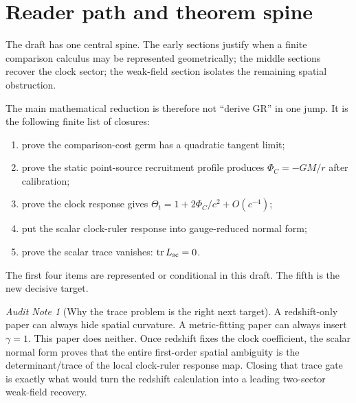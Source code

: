 \documentclass[11pt]{article}
\theoremstyle{remark}
\newtheorem{audit}[theorem]{Audit Note}
\begin{document}
\section{Reader path and theorem spine}
\label{sec:reader-path}

The draft has one central spine.  The early sections justify when a finite comparison calculus may be represented geometrically; the middle sections recover the clock sector; the weak-field section isolates the remaining spatial obstruction.

\begin{center}
\end{center}

The main mathematical reduction is therefore not ``derive GR'' in one jump.  It is the following finite list of closures:
\begin{enumerate}
\item prove the comparison-cost germ has a quadratic tangent limit;
\item prove the static point-source recruitment profile produces \(\Phi_C=-GM/r\) after calibration;
\item prove the clock response gives \(\Theta_t=1+2\Phi_C/c^2+O(c^{-4})\);
\item put the scalar clock-ruler response into gauge-reduced normal form;
\item prove the scalar trace vanishes: \(\operatorname{tr}L_{\rm sc}=0\).
\end{enumerate}
The first four items are represented or conditional in this draft.  The fifth is the new decisive target.

\begin{audit}[Why the trace problem is the right next target]
A redshift-only paper can always hide spatial curvature.  A metric-fitting paper can always insert \(\gamma=1\).  This paper does neither.  Once redshift fixes the clock coefficient, the scalar normal form proves that the entire first-order spatial ambiguity is the determinant/trace of the local clock-ruler response map.  Closing that trace gate is exactly what would turn the redshift calculation into a leading two-sector weak-field recovery.
\end{audit}
\end{document}
